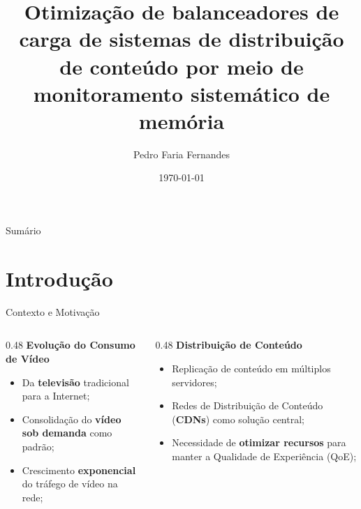 \documentclass[10pt]{beamer}
\title[Otimização de balanceadores de carga de sistemas de distribuição
de conteúdo por meio de monitoramento sistemático de memória]{Otimização de balanceadores de carga de sistemas de distribuição
de conteúdo por meio de monitoramento sistemático de memória}
\subtitle{}
\author{Pedro Faria Fernandes}
\institute[]{Universidade do Estado de Santa Catarina}
\date[\today]{\today}
\begin{document}
\frame{\titlepage}

\begin{frame}[allowframebreaks]{Sumário}
    \tableofcontents
\end{frame}


\section{Introdução}

\begin{frame}{Contexto e Motivação}
    \begin{columns}[t]
    \begin{column}{0.48\textwidth}
        \textbf{Evolução do Consumo de Vídeo}
        \begin{itemize}
            \item Da \textbf{televisão} tradicional para a Internet;
            \item Consolidação do \textbf{vídeo sob demanda} como padrão;
            \item Crescimento \textbf{exponencial} do tráfego de vídeo na rede;
        \end{itemize}
    \end{column}
    \begin{column}{0.48\textwidth}
        \textbf{Distribuição de Conteúdo}
        \begin{itemize}
            \item Replicação de conteúdo em múltiplos servidores;
            \item Redes de Distribuição de Conteúdo (\textbf{CDNs}) como solução central;
            \item Necessidade de \textbf{otimizar recursos} para manter a Qualidade de Experiência (QoE);
        \end{itemize}
    \end{column}
    \end{columns}
\end{frame}
\end{document}
